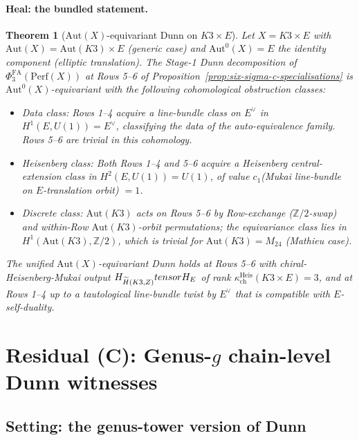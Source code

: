 \documentclass[11pt]{article}
\newtheorem{theorem}{Theorem}[section]
\newcommand{\PhiFA}{\Phi^{\mathrm{FA}}}
\newcommand{\Z}{\mathbb{Z}}
\newcommand{\Perf}{\mathrm{Perf}}
\newcommand{\Aut}{\mathrm{Aut}}
\begin{document}
\paragraph{Heal: the bundled statement.}
\begin{theorem}[$\Aut(X)$-equivariant Dunn on $K3 \times E$]
  \label{thm:aut-equivariant-dunn-k3e}
  Let $X = K3 \times E$ with $\Aut(X) = \Aut(K3) \times E$ (generic case)
  and $\Aut^0(X) = E$ the identity component (elliptic translation).
  The Stage-1 Dunn decomposition of $\PhiFA_3(\Perf(X))$ at Rows 5--6
  of Proposition~\ref{prop:six-sigma-c-specialisations} is
  $\Aut^0(X)$-equivariant with the following cohomological obstruction
  classes:
  \begin{itemize}
  \item \emph{Data class:} Rows 1--4 acquire a line-bundle class on
    $E^\vee$ in $H^1(E, U(1)) = E^\vee$, classifying the data of the
    auto-equivalence family. Rows 5--6 are trivial in this
    cohomology.
  \item \emph{Heisenberg class:} Both Rows 1--4 and 5--6 acquire a
    Heisenberg central-extension class in $H^2(E, U(1)) = U(1)$, of
    value $c_1$(Mukai line-bundle on $E$-translation orbit) $= 1$.
  \item \emph{Discrete class:} $\Aut(K3)$ acts on Rows 5--6 by
    Row-exchange ($\Z/2$-swap) and within-Row $\Aut(K3)$-orbit
    permutations; the equivariance class lies in $H^1(\Aut(K3), \Z/2)$,
    which is trivial for $\Aut(K3) = M_{24}$ (Mathieu case).
  \end{itemize}
  The unified $\Aut(X)$-equivariant Dunn holds at Rows 5--6 with
  chiral-Heisenberg-Mukai output $\cH_{\widetilde H(K3, \Z)} \otimes
  \cH_E$ of rank $\kappa_{\mathrm{ch}}^{\mathrm{Heis}}(K3 \times E) =
  3$, and at Rows 1--4 up to a tautological line-bundle twist by
  $E^\vee$ that is compatible with $E$-self-duality.
\end{theorem}

\section{Residual (C): Genus-$g$ chain-level Dunn witnesses}
\label{sec:residual-C-genus-tower}

\subsection{Setting: the genus-tower version of Dunn}
\end{document}

